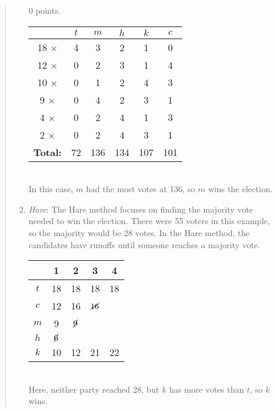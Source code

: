 \documentclass{hw}
\begin{document}
\begin{enumerate}
\begin{quote}
\begin{enumerate}
0 points.\\
\begin{center}
\begin{tabular}{c | c | c | c | c | c}
& $t$ & $m$ & $h$ & $k$ & $c$\\
\hline
18 $\times$ & 4 & 3 & 2 & 1 & 0\\
\hline
12 $\times$ & 0 & 2 & 3 & 1 & 4\\
\hline
10 $\times$ & 0 & 1 & 2 & 4 & 3\\
\hline
9 $\times$ & 0 & 4 & 2 & 3 & 1\\
\hline
4 $\times$ & 0 & 2 & 4 & 1 & 3\\
\hline
2 $\times$ & 0 & 2 & 4 & 3 & 1\\
\hline
\textbf{Total: }& 72 & 136 & 134 & 107 & 101
\end{tabular}
\end{center}
\noindent\\
\noindent In this case, $m$ had the most votes at 136, so $m$ wins the election.\\
\item \textit{Hare}: The Hare method focuses on finding the majority vote needed to win the election.
There were 55 voters in this example, so the majority would be 28 votes. In the Hare method, the candidates
have runoffs until someone reaches a majority vote.\\
\begin{center}
\begin{tabular}{c | c | c | c | c}
& 1 & 2 & 3 & 4\\
\hline
$t$ & 18 & 18 & 18 & 18\\
\hline
$c$ & 12 & 16 & $\cancel{16}$ & \\
\hline
$m$ & 9 & $\cancel{9}$ & & \\
\hline
$h$ & $\cancel{6}$ & & & \\
\hline
$k$ & 10 & 12 & 21 & 22\\
\hline
\end{tabular}
\end{center}
\noindent\\
\noindent Here, neither party reached 28, but $k$ has more votes than $t$, so $k$ wins.
\end{enumerate}
\end{quote}

\end{enumerate}
\end{document}
